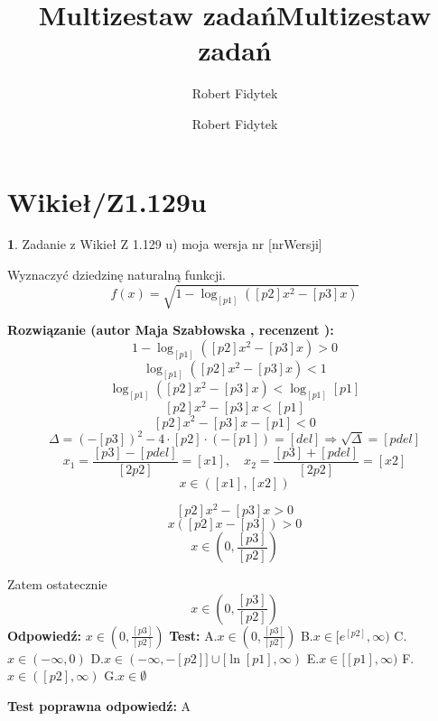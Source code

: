 \documentclass[12pt, a4paper]{article}
\title{Multizestaw zadań}
\author{Robert Fidytek}
\date{}\documentclass[12pt, a4paper]{article}
\title{Multizestaw zadań}
\author{Robert Fidytek}
\date{}
\theoremstyle{definition} %
\newtheorem{zad}{}
\theoremstyle{definition} %
\newtheorem{zad}{}
\newcommand{\kategoria}[1]{\section{#1}} %
\newcommand{\zadStart}[1]{\begin{zad}#1\newline} %
\newcommand{\zadStop}{\end{zad}}   %
\newcommand{\rozwStart}[2]{\noindent \textbf{Rozwiązanie (autor #1 , recenzent #2): }\newline} %
\newcommand{\rozwStop}{\newline}                                            %
\newcommand{\odpStart}{\noindent \textbf{Odpowiedź:}\newline}    %
\newcommand{\odpStop}{\newline}                                             %
\newcommand{\testStart}{\noindent \textbf{Test:}\newline} %
\newcommand{\testStop}{\newline} %
\newcommand{\kluczStart}{\noindent \textbf{Test poprawna odpowiedź:}\newline} %
\newcommand{\kluczStop}{\newline} %
\begin{document}
\maketitle


\kategoria{Wikieł/Z1.129u}
\zadStart{Zadanie z Wikieł Z 1.129 u) moja wersja nr [nrWersji]}

Wyznaczyć dziedzinę naturalną funkcji.
$$f(x)=\sqrt{1-\log_{[p1]}([p2]x^{2}-[p3]x)}$$
\zadStop

\rozwStart{Maja Szabłowska}{}
$$1-\log_{[p1]}([p2]x^{2}-[p3]x)>0$$
$$\log_{[p1]}([p2]x^{2}-[p3]x)<1$$
$$\log_{[p1]}([p2]x^{2}-[p3]x)<\log_{[p1]}[p1]$$
$$[p2]x^{2}-[p3]x<[p1]$$
$$[p2]x^{2}-[p3]x-[p1]<0$$
$$\Delta=(-[p3])^{2}-4\cdot[p2]\cdot(-[p1])=[del] \Rightarrow \sqrt{\Delta}=[pdel]$$
$$x_{1}=\frac{[p3]-[pdel]}{[2p2]}=[x1], \quad x_{2}=\frac{[p3]+[pdel]}{[2p2]}=[x2]$$
$$x\in([x1],[x2])$$

$$[p2]x^{2}-[p3]x>0$$
$$x([p2]x-[p3])>0$$
$$x\in\left(0,\frac{[p3]}{[p2]}\right)$$

Zatem ostatecznie
$$x\in\left(0,\frac{[p3]}{[p2]}\right)$$
\rozwStop
\odpStart
$x\in\left(0,\frac{[p3]}{[p2]}\right)$
\odpStop
\testStart
A.$x\in\left(0,\frac{[p3]}{[p2]}\right)$
B.$x\in[e^{[p2]},\infty)$
C.$x\in(-\infty, 0)$
D.$x\in(-\infty, -[p2]] \cup [\ln[p1],\infty)$
E.$x\in[[p1],\infty)$
F.$x\in([p2],\infty)$
G.$x\in\emptyset$

\testStop
\kluczStart
A
\kluczStop
\end{document}

